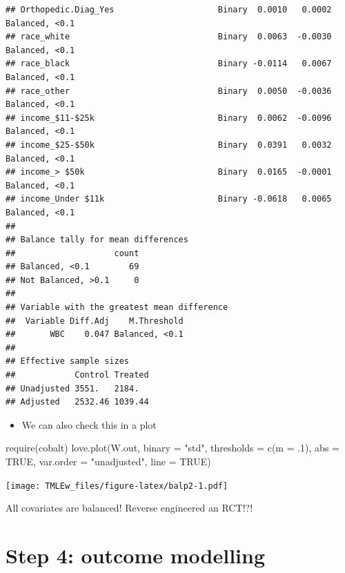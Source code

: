 \documentclass[
]{book}
\newenvironment{Shaded}{\begin{snugshade}}{\end{snugshade}}
\newcommand{\AttributeTok}[1]{\textcolor[rgb]{0.77,0.63,0.00}{#1}}
\newcommand{\ConstantTok}[1]{\textcolor[rgb]{0.00,0.00,0.00}{#1}}
\newcommand{\DecValTok}[1]{\textcolor[rgb]{0.00,0.00,0.81}{#1}}
\newcommand{\FunctionTok}[1]{\textcolor[rgb]{0.00,0.00,0.00}{#1}}
\newcommand{\NormalTok}[1]{#1}
\newcommand{\StringTok}[1]{\textcolor[rgb]{0.31,0.60,0.02}{#1}}
\providecommand{\tightlist}{%
  \setlength{\itemsep}{0pt}\setlength{\parskip}{0pt}}
\begin{document}
\begin{verbatim}
## Orthopedic.Diag_Yes                     Binary  0.0010   0.0002 Balanced, <0.1
## race_white                              Binary  0.0063  -0.0030 Balanced, <0.1
## race_black                              Binary -0.0114   0.0067 Balanced, <0.1
## race_other                              Binary  0.0050  -0.0036 Balanced, <0.1
## income_$11-$25k                         Binary  0.0062  -0.0096 Balanced, <0.1
## income_$25-$50k                         Binary  0.0391   0.0032 Balanced, <0.1
## income_> $50k                           Binary  0.0165  -0.0001 Balanced, <0.1
## income_Under $11k                       Binary -0.0618   0.0065 Balanced, <0.1
## 
## Balance tally for mean differences
##                    count
## Balanced, <0.1        69
## Not Balanced, >0.1     0
## 
## Variable with the greatest mean difference
##  Variable Diff.Adj    M.Threshold
##       WBC    0.047 Balanced, <0.1
## 
## Effective sample sizes
##            Control Treated
## Unadjusted 3551.   2184.  
## Adjusted   2532.46 1039.44
\end{verbatim}

\begin{itemize}
\tightlist
\item
  We can also check this in a plot
\end{itemize}

\begin{Shaded}
\begin{Highlighting}[]
\FunctionTok{require}\NormalTok{(cobalt)}
\FunctionTok{love.plot}\NormalTok{(W.out, }\AttributeTok{binary =} \StringTok{"std"}\NormalTok{,}
          \AttributeTok{thresholds =} \FunctionTok{c}\NormalTok{(}\AttributeTok{m =}\NormalTok{ .}\DecValTok{1}\NormalTok{),}
          \AttributeTok{abs =} \ConstantTok{TRUE}\NormalTok{, }
          \AttributeTok{var.order =} \StringTok{"unadjusted"}\NormalTok{, }
          \AttributeTok{line =} \ConstantTok{TRUE}\NormalTok{)}
\end{Highlighting}
\end{Shaded}

\texttt{[image: TMLEw\_files/figure-latex/balp2-1.pdf]}

\begin{rmdcomment}
All covariates are balanced! Reverse engineered an RCT!?!
\end{rmdcomment}

\hypertarget{step-4-outcome-modelling}{%
\section{Step 4: outcome modelling}\label{step-4-outcome-modelling}}
\end{document}
